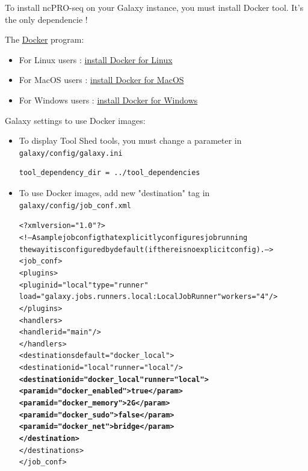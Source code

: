 \documentclass[12pt]{article}
\begin{document}
To install ncPRO-seq on your Galaxy instance, you must install Docker tool. It's the only dependencie !

 \item The \href{https://www.docker.com}{ Docker} program:
 
\begin{itemize}
 \item For Linux users : \href{https://docs.docker.com/linux/step_one}{install Docker for Linux}
 \item For MacOS users : \href{https://docs.docker.com/mac/step_one}{install Docker for MacOS}
 \item For Windows users : \href{https://docs.docker.com/windows/step_one}{install Docker for Windows}
\end{itemize}

 \item Galaxy settings to use Docker images:

\begin{itemize}
 \item To display Tool Shed tools, you must change a parameter in \verb|galaxy/config/galaxy.ini|
\begin{verbatim}
tool_dependency_dir = ../tool_dependencies
\end{verbatim}
 \item To use Docker images, add new "destination" tag in \verb|galaxy/config/job_conf.xml|
\begin{alltt}
<?xml version="1.0"?>
<!-- A sample job config that explicitly configures job running \\ the way it is configured by default (if there is no explicit config). -->
<job_conf>
    <plugins>
        <plugin id="local" type="runner" \\ load="galaxy.jobs.runners.local:LocalJobRunner" workers="4"/>
    </plugins>
    <handlers>
        <handler id="main"/>
    </handlers>
    <destinations default="docker_local">
       <destination id="local" runner="local"/>
\textbf{       <destination id="docker_local" runner="local">}
\textbf{            <param id="docker_enabled">true</param>}
\textbf{            <param id="docker_memory">2G</param>}
\textbf{            <param id="docker_sudo">false</param>}
\textbf{            <param id="docker_net">bridge</param>}
\textbf{       </destination>}
    </destinations>
</job_conf>

\end{alltt}
\end{itemize}
\end{document}
